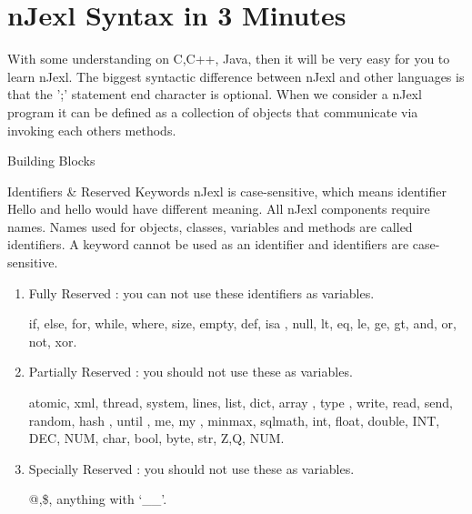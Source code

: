 \chapter{nJexl Syntax in 3 Minutes}\label{intro-njexl}

{\LARGE W}ith some understanding on C,C++, Java, then it will be very easy for you to learn nJexl. The biggest syntactic difference between nJexl and other languages is that the ';' statement end character is optional. When we consider a nJexl program it can be defined as a collection of objects that communicate via invoking each others methods. 


\begin{section}{Building Blocks}

\begin{subsection}{Identifiers \& Reserved Keywords}
nJexl is case-sensitive, which means identifier Hello and hello would have different meaning.
All nJexl components require names. Names used for objects, classes, variables and methods are called identifiers. 
A keyword cannot be used as an identifier and identifiers are case-sensitive. 
\begin{enumerate} 
\item{ Fully Reserved : you can not use these identifiers as variables. 
    \begin{center}
    if, else, for, while, where, size, empty, def, isa , null,
    lt, eq, le, ge, gt, and, or, not, xor.
    \end{center}
}
\item{ Partially Reserved : you should not use these as variables. 
    \begin{center}
    atomic, xml, thread, system, lines, list, dict, array , 
    type , write, read, send, random, hash , until , me, my , minmax, sqlmath,
    int, float, double, INT, DEC, NUM, char, bool, byte, str, Z,Q, NUM.
    \end{center}  
}
\item{ Specially Reserved : you should not use these as variables. 
    \begin{center}
    @,\$, anything with `\_\_'.
    \end{center}   
}
\end{enumerate}

\end{subsection}



\end{section}
